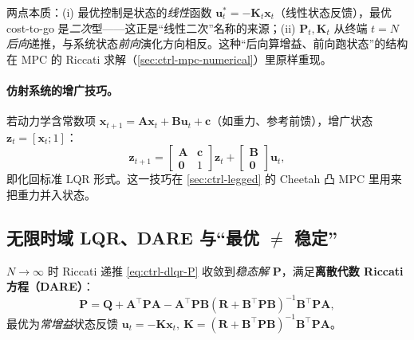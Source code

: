 \begin{insight}
两点本质：(i) 最优控制是状态的\emph{线性}函数 $\mathbf{u}_t^*=-\mathbf{K}_t\mathbf{x}_t$（线性状态反馈），最优 cost-to-go 是\emph{二次}型——这正是“线性二次”名称的来源；(ii) $\mathbf{P}_t,\mathbf{K}_t$ 从终端 $t=N$ \emph{后向}递推，与系统状态\emph{前向}演化方向相反。这种“后向算增益、前向跑状态”的结构在 MPC 的 Riccati 求解（\cref{sec:ctrl-mpc-numerical}）里原样重现。
\end{insight}

\paragraph{仿射系统的增广技巧。}
若动力学含常数项 $\mathbf{x}_{t+1}=\mathbf{A}\mathbf{x}_t+\mathbf{B}\mathbf{u}_t+\mathbf{c}$（如重力、参考前馈），增广状态 $\mathbf{z}_t=[\mathbf{x}_t;1]$\cite{bansal2017lqr}：
\begin{equation}
  \mathbf{z}_{t+1}=\begin{bmatrix}\mathbf{A}&\mathbf{c}\\\mathbf{0}&1\end{bmatrix}\mathbf{z}_t+\begin{bmatrix}\mathbf{B}\\\mathbf{0}\end{bmatrix}\mathbf{u}_t,
  \label{eq:ctrl-affine}
\end{equation}
即化回标准 LQR 形式。这一技巧在 \cref{sec:ctrl-legged} 的 Cheetah 凸 MPC 里用来把重力并入状态。

\subsection{无限时域 LQR、DARE 与“最优 \texorpdfstring{$\ne$}{!=} 稳定”}
\label{sec:ctrl-lqr-dare}

$N\to\infty$ 时 Riccati 递推 \cref{eq:ctrl-dlqr-P} 收敛到\emph{稳态解} $\mathbf{P}$，满足\textbf{离散代数 Riccati 方程（DARE）}\cite{bansal2017lqr,rawlings2020mpc}：
\begin{equation}
  \boxed{\mathbf{P}=\mathbf{Q}+\mathbf{A}^\top\mathbf{P}\mathbf{A}-\mathbf{A}^\top\mathbf{P}\mathbf{B}(\mathbf{R}+\mathbf{B}^\top\mathbf{P}\mathbf{B})^{-1}\mathbf{B}^\top\mathbf{P}\mathbf{A},}
  \label{eq:ctrl-dare}
\end{equation}
最优为\emph{常增益}状态反馈 $\mathbf{u}_t=-\mathbf{K}\mathbf{x}_t,\ \mathbf{K}=(\mathbf{R}+\mathbf{B}^\top\mathbf{P}\mathbf{B})^{-1}\mathbf{B}^\top\mathbf{P}\mathbf{A}$。

